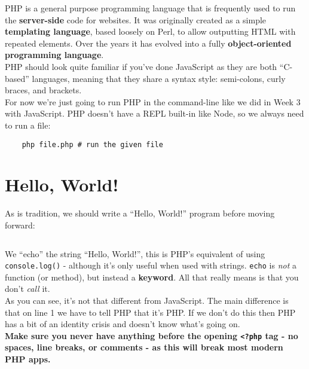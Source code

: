 PHP is a general purpose programming language that is frequently used to run the \textbf{server-side} code for websites. It was originally created as a simple \textbf{templating language}, based loosely on Perl, to allow outputting HTML with repeated elements. Over the years it has evolved into a fully \textbf{object-oriented programming language}.
\\

PHP should look quite familiar if you've done JavaScript as they are both ``C-based'' languages, meaning that they share a syntax style: semi-colons, curly braces, and brackets.
\\

For now we're just going to run PHP in the command-line like we did in Week 3 with JavaScript. PHP doesn't have a REPL built-in like Node, so we always need to run a file:

\begin{verbatim}
    php file.php # run the given file
\end{verbatim}


\section{Hello, World!}

As is tradition, we should write a ``Hello, World!'' program before moving forward:

\inputminted{php}{01/figures/01/01-hello.php}

We ``echo'' the string ``Hello, World!'', this is PHP's equivalent of using \texttt{console.log()} - although it's only useful when used with strings. \texttt{echo} is \textit{not} a function (or method), but instead a \textbf{keyword}. All that really means is that you don't \textit{call} it.
\\

As you can see, it's not that different from JavaScript. The main difference is that on line 1 we have to tell PHP that it's PHP. If we don't do this then PHP has a bit of an identity crisis and doesn't know what's going on.
\\

\textbf{Make sure you never have anything before the opening \texttt{<?php} tag - no spaces, line breaks, or comments - as this will break most modern PHP apps.}



